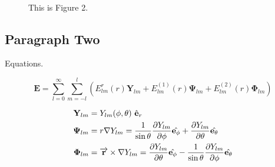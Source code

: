 \documentclass[11pt, a4paper]{article}
\numberwithin{equation}{section} %
\begin{document}
		\begin{figure}[ht]
			\centering
			\quad
			 \\
			\caption{This is Figure 2.}
		\end{figure}

	\subsection{Paragraph Two}

		Equations.

		\begin{equation}
			\mathbf{E}=\sum_{l=0}^{\infty} \sum_{m=-l}^{l}\left(E_{l m}^{r}(r) \mathbf{Y}_{l m}+E_{l m}^{(1)}(r) \mathbf{\Psi}_{l m}+E_{l m}^{(2)}(r) \mathbf{\Phi}_{l m}\right)
		\end{equation}

		\begin{align}
			\mathbf{Y}_{l m}    & =Y_{l m}(\phi,\theta)\  \hat{\mathbf{e}}_r \\
			\notag
		    \mathbf{\Psi}_{l m} & =r \nabla Y_{l m}=\frac{1}{\sin \theta} \frac{\partial Y_{lm}}{\partial \phi}\hat{\mathbf{e}_{\phi}} + \frac{\partial Y_{lm}}{\partial \theta}\hat{\mathbf{e}_{\theta}} \\
		    \mathbf{\Phi}_{l m} & =\overrightarrow{\mathbf{r}} \times \nabla Y_{l m}=\frac{\partial Y_{lm}}{\partial \theta}\hat{\mathbf{e}_{\phi}} -\frac{1}{\sin \theta} \frac{\partial Y_{lm}}{\partial \phi}\hat{\mathbf{e}_{\theta}}
		\end{align}
\end{document}
